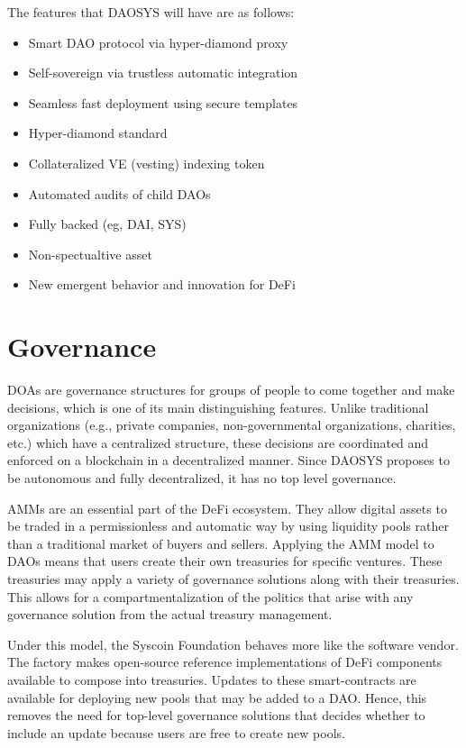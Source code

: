 \documentclass[journal,twocolumn,12pt]{ieeesyscoin}
\begin{document}
The features that DAOSYS will have are as follows:

\begin{itemize}
  \item Smart DAO protocol via hyper-diamond proxy
  \item Self-sovereign via trustless automatic integration
  \item Seamless fast deployment using secure templates
  \item Hyper-diamond standard
  \item Collateralized VE (vesting) indexing token
  \item Automated audits of child DAOs
  \item Fully backed (eg, DAI, SYS)
  \item Non-spectualtive asset
  \item New emergent behavior and innovation for DeFi
\end{itemize}  

\section{Governance}
\label{sec:governance}

DOAs are governance structures for groups of people to come together and make decisions, which is one of its main distinguishing features. Unlike traditional organizations (e.g., private companies, non-governmental organizations, charities, etc.) which have a centralized structure, these decisions are coordinated and enforced on a blockchain in a decentralized manner. Since DAOSYS proposes to be autonomous and fully decentralized, it has no top level governance.

AMMs are an essential part of the DeFi ecosystem. They allow digital assets to be traded in a permissionless and automatic way by using liquidity pools rather than a traditional market of buyers and sellers. Applying the AMM model to DAOs means that users create their own treasuries for specific ventures. These treasuries may apply a variety of governance solutions along with their treasuries. This allows for a compartmentalization of the politics that arise with any governance solution from the actual treasury management.

Under this model, the Syscoin Foundation behaves more like the software vendor. The factory makes open-source reference implementations of DeFi components available to compose into treasuries. Updates to these smart-contracts are available for deploying new pools that may be added to a DAO. Hence, this removes the need for top-level governance solutions that decides whether to include an update because users are free to create new pools.
\end{document}

